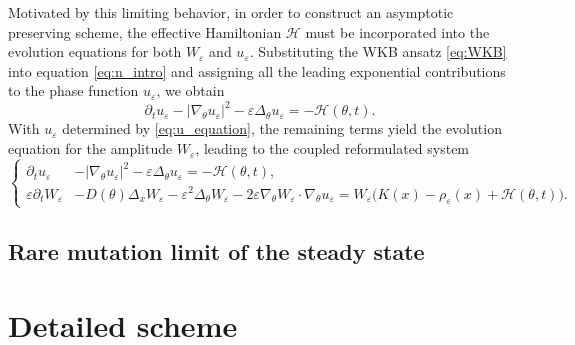 \documentclass[11pt, dina4, amsfont12]{article}
\begin{document}
Motivated by this limiting behavior, in order to construct an asymptotic preserving
scheme, the effective Hamiltonian $\mathcal{H}$ must be incorporated into the evolution
equations for both $W_\varepsilon$ and $u_\varepsilon$.
Substituting the WKB ansatz \eqref{eq:WKB} into equation \eqref{eq:n_intro} and assigning all the
leading exponential contributions to the phase function $u_\varepsilon$, we obtain 
\begin{equation}\label{eq:u_equation}
\partial_t u_\varepsilon
- |\nabla_\theta u_\varepsilon|^2
- \varepsilon \Delta_\theta u_\varepsilon
= - \mathcal{H}(\theta,t).
\end{equation}
With $u_\varepsilon$ determined by \eqref{eq:u_equation}, the remaining terms yield the evolution
equation for the amplitude $W_\varepsilon$, leading to the coupled reformulated system
\begin{equation}\label{eq:WKB_reformulation}
\left\{
\begin{aligned}
\partial_t u_\varepsilon
&- |\nabla_\theta u_\varepsilon|^2
- \varepsilon \Delta_\theta u_\varepsilon
= - \mathcal{H}(\theta,t), \\
\varepsilon \partial_t W_\varepsilon
&- D(\theta)\Delta_x W_\varepsilon
- \varepsilon^2 \Delta_\theta W_\varepsilon
- 2\varepsilon \nabla_\theta W_\varepsilon \cdot \nabla_\theta u_\varepsilon = W_\varepsilon\bigl(K(x)-\rho_\varepsilon(x) + \mathcal{H}(\theta,t)\bigr).
\end{aligned}
\right.
\end{equation}

\subsection{Rare mutation limit of the steady state}



\section{Detailed scheme}





\end{document}
